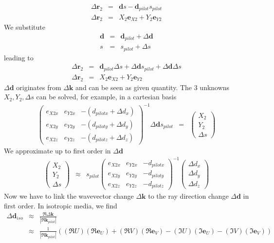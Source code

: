\documentclass[12pt,a4paper,twoside,openright,BCOR10mm,headsepline,titlepage,abstracton,chapterprefix,final]{scrreprt}
\newcommand\Vector[1]{{\mathbf{#1}}}
\newcommand\wavenumber{k}
\newcommand\Wavevector{\Vector{\wavenumber}}
\begin{document}
\begin{eqnarray}
  \Delta \Vector{r}_2  &=& \Vector{d} s - \Vector{d}_{pilot} s_{pilot} \\
  \Delta \Vector{r}_2  &=& X_2 \Vector{e}_{X2} + Y_2 \Vector{e}_{Y2}
\end{eqnarray}
We substitute
\begin{eqnarray}
 \Vector{d} &=& \Vector{d}_{pilot} + \Delta \Vector{d} \\
 s &=& s_{pilot} + \Delta s
\end{eqnarray}
leading to
\begin{eqnarray}
  \Delta \Vector{r}_2  &=& \Vector{d}_{pilot} \Delta s + \Delta \Vector{d} s_{pilot} + \Delta \Vector{d} \Delta s \\
  \Delta \Vector{r}_2  &=& X_2 \Vector{e}_{X2} + Y_2 \Vector{e}_{Y2}
\end{eqnarray}
$\Delta \Vector{d}$ originates from $\Delta \Wavevector$ and can be seen as given quantity.
The 3 unknowns $X_2 , Y_2 , \Delta s$ can be solved, for example, in a cartesian basis
\begin{eqnarray}
 \begin{pmatrix}
  e_{X2x} & e_{Y2x} & - ( d_{pilotx} + \Delta d_x ) \\
  e_{X2y} & e_{Y2y} & - ( d_{piloty} + \Delta d_y ) \\
  e_{X2z} & e_{Y2z} & - ( d_{pilotz} + \Delta d_z ) 
 \end{pmatrix}^{-1}
 \Delta \Vector{d} s_{pilot} &=& 
 \begin{pmatrix}
  X_2 \\ Y_2 \\ \Delta s
 \end{pmatrix} 
\end{eqnarray}
We approximate up to first order in $\Delta \Vector{d}$
\begin{eqnarray}
 \begin{pmatrix}
  X_2 \\ Y_2 \\ \Delta s
 \end{pmatrix} 
 &\approx& s_{pilot}
 \begin{pmatrix}
  e_{X2x} & e_{Y2x} & - d_{pilotx} \\
  e_{X2y} & e_{Y2y} & - d_{piloty} \\
  e_{X2z} & e_{Y2z} & - d_{pilotz} 
 \end{pmatrix}^{-1}
 \begin{pmatrix}
  \Delta d_x \\ \Delta d_y \\ \Delta d_z
 \end{pmatrix}
\end{eqnarray}
Now we have to link the wavevector change $\Delta \Wavevector$ to the ray direction change $\Delta \Vector{d}$ in first order.
In isotropic media, we find
\begin{eqnarray}
 \Delta \Vector{d}_{iso} 
 &\approx& \frac{\Re \Delta \Wavevector}{|\Re \Wavevector_{pilot}|}
 \\
 &\approx&
  \frac{1}{|\Re \Wavevector_{pilot}|}
  \left(
      (\Re U)(\Re \Vector{e}_U)
    + (\Re V)(\Re \Vector{e}_V)
    - (\Im U)(\Im \Vector{e}_U)
    - (\Im V)(\Im \Vector{e}_V)
  \right) \nonumber
\end{eqnarray}
\end{document}
